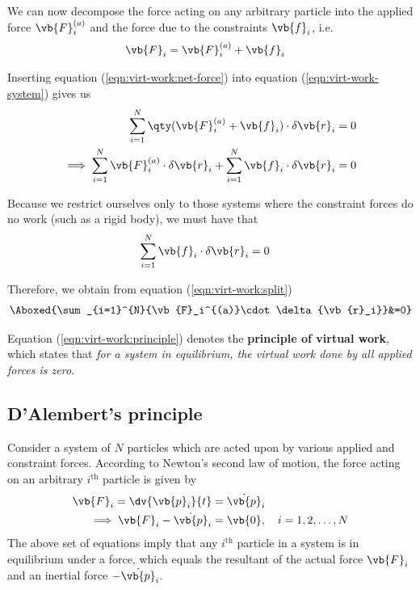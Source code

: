 We can now decompose the force acting on any arbitrary particle into the applied force $\vb{F}_i^{(a)}$ and the force due to the constraints $\vb{f}_i$, i.e.
\begin{align}
	\vb{F}_i&=\vb{F}_i^{(a)}+\vb{f}_i \label{eqn:virt-work:net-force}
\end{align}

Inserting equation (\ref{eqn:virt-work:net-force}) into equation (\ref{eqn:virt-work-system}) gives us
\begin{align}
	\sum_{i=1}^{N}{\qty(\vb{F}_i^{(a)}+\vb{f}_i)\cdot\delta{\vb{r}_i}}&=0 \nonumber \\
	\implies\sum_{i=1}^{N}{\vb{F}_i^{(a)}\cdot\delta{\vb{r}_i}}+\sum_{i=1}^{N}{\vb{f}_i\cdot\delta{\vb{r}_i}}&=0 \label{eqn:virt-work:split}
\end{align}

Because we restrict ourselves only to those systems where the constraint forces do no work (such as a rigid body), we must have that
\begin{align*}
	\sum_{i=1}^{N}{\vb{f}_i\cdot\delta{\vb{r}_i}}&=0
\end{align*}

Therefore, we obtain from equation (\ref{eqn:virt-work:split})
\begin{align}
	\Aboxed{\sum_{i=1}^{N}{\vb{F}_i^{(a)}\cdot\delta{\vb{r}_i}}&=0} \label{eqn:virt-work:principle}
\end{align}

Equation (\ref{eqn:virt-work:principle}) denotes the \textbf{principle of virtual work}, which states that \emph{for a system in equilibrium, the virtual work done by all applied forces is zero}.

\setcounter{equation}{0}
\subsection{D'Alembert's principle}
Consider a system of $N$ particles which are acted upon by various applied and constraint forces. According to Newton's second law of motion, the force acting on an arbitrary $i^\text{th}$ particle is given by
\begin{align*}
	\vb{F}_i=\dv{\vb{p}_i}{t}&=\dot{\vb{p}}_i \\
	\implies\vb{F}_i-\dot{\vb{p}}_i&=\vb{0},\quad i=1,2,\dots,N
\end{align*}
The above set of equations imply that any $i^\text{th}$ particle in a system is in equilibrium under a force, which equals the resultant of the actual force $\vb{F}_i$ and an inertial force $-\dot{\vb{p}}_i$.

